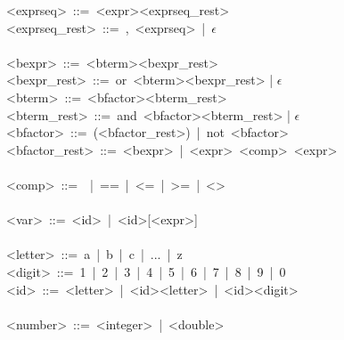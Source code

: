 \documentclass{article}
\begin{document}
<exprseq>\ ::=\ <expr><exprseq\_rest>\\
<exprseq\_rest>\ ::=\ ,\ <exprseq>\ |\ $\epsilon$\\
\\
<bexpr>\ ::=\ <bterm><bexpr\_rest>\\
<bexpr\_rest>\ ::=\ or\ <bterm><bexpr\_rest> | $\epsilon$ \\
<bterm>\ ::=\ <bfactor><bterm\_rest>\\
<bterm\_rest>\ ::=\ and\ <bfactor><bterm\_rest> | $\epsilon$\\
<bfactor>\ ::=\ (<bfactor\_rest>)\ |\ not\ <bfactor>\\
<bfactor\_rest>\ ::=\ <bexpr>\ |\ <expr>\ <comp>\ <expr>\\
\\
<comp>\ ::=\ < | >\ |\ ==\ |\ <=\ |\ >=\ |\ <>\\
\\
<var>\ ::=\ <id>\ |\ <id>[<expr>]\\
\\
<letter>\ ::=\ a\ |\ b\ |\ c\ |\ ...\ |\ z\\
<digit>\ ::=\ 1\ |\ 2\ |\ 3\ |\ 4\ |\ 5\ |\ 6\ |\ 7\ |\ 8\ |\ 9\ |\ 0\\
<id>\ ::=\ <letter>\ |\ <id><letter>\ |\ <id><digit>\\
\\
<number>\ ::=\ <integer>\ |\ <double>\\
\end{document}
